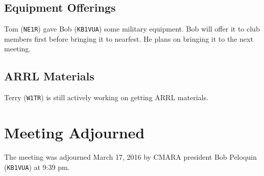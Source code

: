 \documentclass[10pt,letterpaper]{article}
\begin{document}
\subsection{Equipment Offerings}
Tom (\texttt{NE1R}) gave Bob (\texttt{KB1VUA}) some military equipment. Bob will offer it to club members first before bringing it to nearfest. He plans on bringing it to the next meeting.

\subsection{ARRL Materials}

Terry (\texttt{W1TR}) is still actively working on getting ARRL materials.

\section{Meeting Adjourned}
The meeting was adjourned March 17, 2016 by CMARA president Bob Peloquin (\texttt{KB1VUA}) at 9:39 pm.
\end{document}
